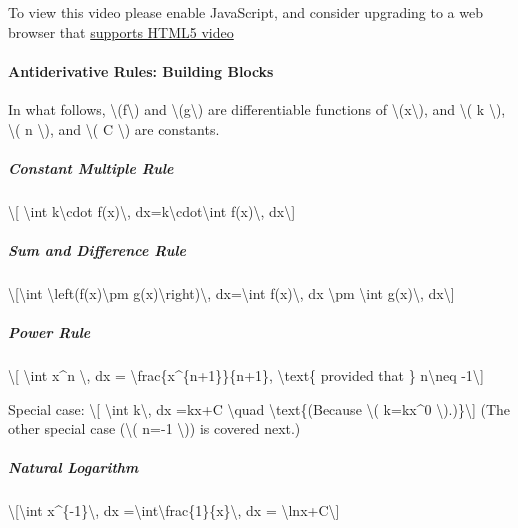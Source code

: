 To view this video please enable JavaScript, and consider upgrading to a
web browser that \href{http://videojs.com/html5-video-support/}{supports
HTML5 video}

\hypertarget{antiderivative-rules-building-blocks}{%
\paragraph{Antiderivative Rules: Building
Blocks}\label{antiderivative-rules-building-blocks}}

In what follows, \textbackslash{}(f\textbackslash{}) and
\textbackslash{}(g\textbackslash{}) are differentiable functions of
\textbackslash{}(x\textbackslash{}), and \textbackslash{}( k
\textbackslash{}), \textbackslash{}( n \textbackslash{}), and
\textbackslash{}( C \textbackslash{}) are constants.

\hypertarget{constant-multiple-rule-1}{%
\subparagraph{Constant Multiple Rule}\label{constant-multiple-rule-1}}

\textbackslash{}{[} \textbackslash{}int k\textbackslash{}cdot
f(x)\textbackslash{}, dx=k\textbackslash{}cdot\textbackslash{}int
f(x)\textbackslash{}, dx\textbackslash{}{]}

\hypertarget{sum-and-difference-rule-1}{%
\subparagraph{Sum and Difference Rule}\label{sum-and-difference-rule-1}}

\textbackslash{}{[}\textbackslash{}int
\textbackslash{}left(f(x)\textbackslash{}pm
g(x)\textbackslash{}right)\textbackslash{}, dx=\textbackslash{}int
f(x)\textbackslash{}, dx \textbackslash{}pm \textbackslash{}int
g(x)\textbackslash{}, dx\textbackslash{}{]}

\hypertarget{power-rule-1}{%
\subparagraph{Power Rule}\label{power-rule-1}}

\textbackslash{}{[} \textbackslash{}int x\^{}n \textbackslash{}, dx =
\textbackslash{}frac\{x\^{}\{n+1\}\}\{n+1\}, \textbackslash{}text\{
provided that \} n\textbackslash{}neq -1\textbackslash{}{]}

Special case: \textbackslash{}{[} \textbackslash{}int k\textbackslash{},
dx =kx+C \textbackslash{}quad \textbackslash{}text\{(Because
\textbackslash{}( k=kx\^{}0 \textbackslash{}).)\}\textbackslash{}{]}
(The other special case (\textbackslash{}( n=-1 \textbackslash{})) is
covered next.)

\hypertarget{natural-logarithm-1}{%
\subparagraph{Natural Logarithm}\label{natural-logarithm-1}}

\textbackslash{}{[}\textbackslash{}int x\^{}\{-1\}\textbackslash{}, dx
=\textbackslash{}int\textbackslash{}frac\{1\}\{x\}\textbackslash{}, dx =
\textbackslash{}ln\textbar{}x\textbar{}+C\textbackslash{}{]}

